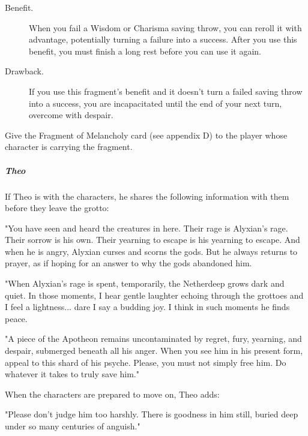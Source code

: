 \documentclass[10pt,a4paper,twoside,fancy,bg=print,twocolumn,openany,nodeprecatedcode]{dndbook}
\begin{document}
\begin{DndSidebar}[float=!b]{}

\begin{description}
\item[Benefit.]
When you fail a Wisdom or Charisma saving throw, you can reroll it with advantage, potentially turning a failure into a success. After you use this benefit, you must finish a long rest before you can use it again.
\item[Drawback.]
If you use this fragment's benefit and it doesn't turn a failed saving throw into a success, you are incapacitated until the end of your next turn, overcome with despair.
\end{description}



\end{DndSidebar}

Give the Fragment of Melancholy card (see appendix D) to the player whose character is carrying the fragment.

\subparagraph{Theo}
If Theo is with the characters, he shares the following information with them before they leave the grotto:

\begin{DndReadAloud}{}
"You have seen and heard the creatures in here. Their rage is Alyxian's rage. Their sorrow is his own. Their yearning to escape is his yearning to escape. And when he is angry, Alyxian curses and scorns the gods. But he always returns to prayer, as if hoping for an answer to why the gods abandoned him.

"When Alyxian's rage is spent, temporarily, the Netherdeep grows dark and quiet. In those moments, I hear gentle laughter echoing through the grottoes and I feel a lightness... dare I say a budding joy. I think in such moments he finds peace.

"A piece of the Apotheon remains uncontaminated by regret, fury, yearning, and despair, submerged beneath all his anger. When you see him in his present form, appeal to this shard of his psyche. Please, you must not simply free him. Do whatever it takes to truly save him."

\end{DndReadAloud}

When the characters are prepared to move on, Theo adds:

\begin{DndReadAloud}{}
"Please don't judge him too harshly. There is goodness in him still, buried deep under so many centuries of anguish."

\end{DndReadAloud}
\end{document}
